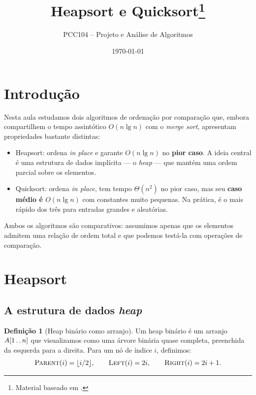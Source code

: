 \documentclass[9pt,a4paper]{extarticle}
\title{Heapsort e Quicksort\footnote{Material baseado em \citep{cormen2009}.}}
\author{PCC104 -- Projeto e Análise de Algoritmos}
\date{\today}
\newcommand{\impt}[1]{\textcolor{important}{#1}}
\newcommand{\ntc}[1]{\textcolor{notice}{#1}}
\theoremstyle{definition}
\newtheorem{definition}{Definição}[section]
\begin{document}
\maketitle
\tableofcontents

\section{Introdução}

Nesta aula estudamos dois algoritmos de ordenação por comparação que,
embora compartilhem o tempo assintótico $O(n\lg n)$ com o \textit{merge sort},
apresentam propriedades bastante distintas:

\begin{itemize}
  \item \impt{Heapsort:} ordena \textit{in place} e garante $O(n\lg n)$ no
    \textbf{pior caso}. A ideia central é uma estrutura de dados implícita --- o
    \textit{heap} --- que mantém uma ordem parcial sobre os elementos.
  \item \impt{Quicksort:} ordena \textit{in place}, tem tempo $\Theta(n^2)$
    no pior caso, mas seu \textbf{caso médio é $O(n\lg n)$} com constantes
    muito pequenas. Na prática, é o mais rápido dos três para entradas
    grandes e aleatórias.
\end{itemize}

\ntc{Ambos os algoritmos são comparativos:} assumimos apenas que os elementos
admitem uma relação de ordem total e que podemos testá-la com operações de
comparação.

\section{Heapsort}

\subsection{A estrutura de dados \textit{heap}}

\begin{definition}[Heap binário como arranjo]\label{def:heap}
Um \impt{heap binário} é um arranjo $A[1\mathinner{.\,.} n]$ que visualizamos como
uma árvore binária quase completa, preenchida da esquerda para a direita.
Para um nó de índice $i$, definimos:
\[
  \textsc{Parent}(i) = \lfloor i/2 \rfloor, \qquad
  \textsc{Left}(i) = 2i, \qquad
  \textsc{Right}(i) = 2i+1.
\]
\end{definition}
\end{document}

